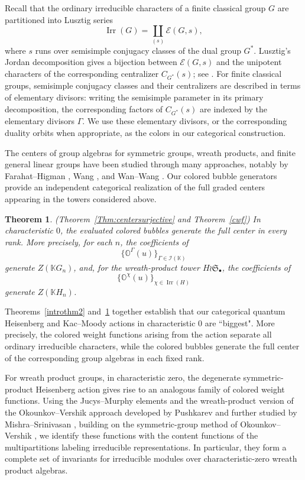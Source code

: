 \documentclass[12pt]{amsart}
\numberwithin{itemcounter}{subsection}
\theoremstyle{plain}
\newtheorem{theorem}{Theorem}[section]
\theoremstyle{definition}
\theoremstyle{remark}
\numberwithin{equation}{section}
\def\bbK{\mathbb{K}}
\def\bbO{\mathbb{O}}
\def\calI{\mathcal{I}}
\def\Irr{{\operatorname{Irr}\nolimits}}
\begin{document}
Recall that the ordinary irreducible characters of a finite classical group $G$ are partitioned into Lusztig series
\[
   \Irr(G)=\coprod_{(s)}\mathcal E(G,s),
\]
where $s$ runs over semisimple conjugacy classes of the dual group $G^*$. Lusztig's Jordan decomposition gives a bijection between $\mathcal E(G,s)$ and the unipotent characters of the corresponding centralizer $C_{G^*}(s)$; see \cite{DL76,DM}. For finite classical groups, semisimple conjugacy classes and their centralizers are described in terms of elementary divisors: writing the semisimple parameter in its primary decomposition, the corresponding factors of $C_{G^*}(s)$ are indexed by the elementary divisors $\Gamma$. We use these elementary divisors, or the corresponding duality orbits when appropriate, as the colors in our categorical construction.

The centers of group algebras for symmetric groups, wreath products, and finite general linear groups have been studied through many approaches, notably by Farahat--Higman \cite{FH59}, Wang \cite{W04b}, and Wan--Wang \cite{WW19}. Our colored bubble generators provide an independent categorical realization of the full graded centers appearing in the towers considered above. %

\begin{theorem}
{\rm (Theorem~\ref{Thm:centersurjective} and Theorem~\ref{cwf})} \label{introthm3}
In characteristic $0$, the evaluated colored bubbles generate the full center in every rank. More precisely, for each $n$, the coefficients of
\[
\big\{\bbO^\Gamma(u)\big\}_{\Gamma\in\calI(\bbK)}
\]
generate $Z(\bbK G_n)$, and, for the wreath-product tower $H\wr\mathfrak S_\bullet$, the coefficients of
\[
\big\{\bbO^\chi(u)\big\}_{\chi\in\Irr(H)}
\]
generate $Z(\bbK H_n)$.
\end{theorem}
Theorems~\ref{introthm2} and~\ref{introthm3} together establish that our categorical quantum Heisenberg and Kac--Moody actions in characteristic 0 are ``biggest". More precisely, the colored weight functions arising from the action separate all ordinary irreducible characters, while the colored bubbles generate the full center of the corresponding group algebras in each fixed rank. 



For wreath product groups, in characteristic zero, the degenerate
symmetric-product Heisenberg action gives rise to an analogous family of
colored weight functions. Using the Jucys--Murphy elements and the
wreath-product version of the Okounkov--Vershik approach developed by Pushkarev \cite{Pus99} and further studied by Mishra--Srinivasan \cite{MS16}, building on the symmetric-group method of Okounkov--Vershik \cite{OV96}, we identify
these functions with the content functions of the multipartitions labeling
irreducible representations. In particular, they form a complete set of
invariants for irreducible modules over characteristic-zero wreath product
algebras.
\end{document}

